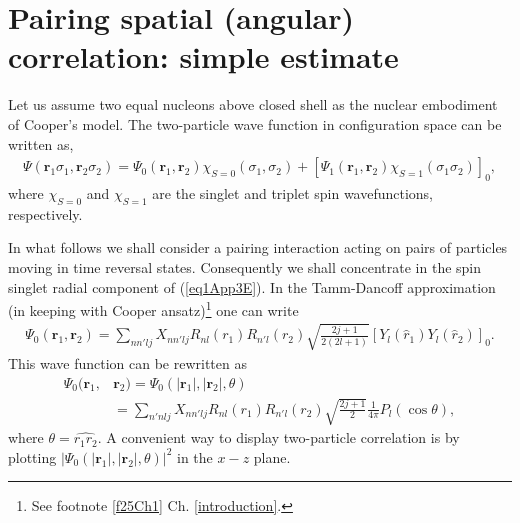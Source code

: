 \section[Simple estimate]{Pairing spatial (angular) correlation: simple estimate}\label{app3D}
Let us assume two equal nucleons above closed shell as the nuclear embodiment of Cooper's model. The two-particle wave function in configuration space can be written as,
\begin{align}\label{eq1App3E}
\Psi(\mathbf r_1\sigma_1,\mathbf r_2\sigma_2)=\Psi_0(\mathbf r_1,\mathbf r_2)\chi_{S=0}(\sigma_1,\sigma_2)+\left[\Psi_1(\mathbf r_1,\mathbf r_2)\chi_{S=1}(\sigma_1\sigma_2)\right]_0,
\end{align}
where $\chi_{S=0}$ and $\chi_{S=1}$ are the singlet and triplet spin wavefunctions, respectively.

In what follows we shall consider a pairing interaction acting on pairs of particles moving in time reversal states. Consequently we shall concentrate in the spin singlet radial component of (\ref{eq1App3E}). In the Tamm-Dancoff approximation (in keeping with Cooper ansatz)\footnote{See footnote \ref{f25Ch1} Ch. \ref{introduction}.} one can write
\begin{align}\label{eq2App3E}
\Psi_0(\mathbf r_1,\mathbf r_2)=\sum_{nn'lj}X_{nn'lj}R_{nl}(r_1)R_{n'l}(r_2)\sqrt{\frac{2j+1}{2(2l+1)}}\left[Y_l(\hat r_1)Y_l(\hat r_2)\right]_0.
\end{align}
This wave function can be rewritten as
\begin{align}\label{eq3App3Ex}
\nonumber\Psi_0(\mathbf r_1,&\mathbf r_2)=\Psi_0(|\mathbf r_1|,|\mathbf r_2|,\theta)\\
&=\sum_{n'nlj}X_{nn'lj}R_{nl}(r_1)R_{n'l}(r_2)\sqrt{\frac{2j+1}{2}}\frac{1}{4\pi}P_l(\cos\theta),
\end{align}
where $\theta=\widehat{r_1r_2}$. A convenient way to display two-particle correlation is by plotting $|\Psi_0(|\mathbf r_1|,|\mathbf r_2|,\theta)|^2$ in the $x-z$ plane.





